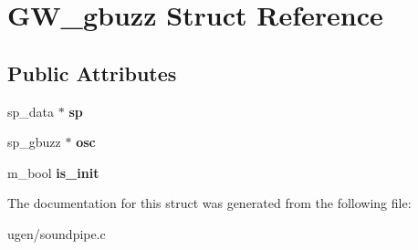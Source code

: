 \hypertarget{structGW__gbuzz}{}\section{G\+W\+\_\+gbuzz Struct Reference}
\label{structGW__gbuzz}
\subsection*{Public Attributes}
\begin{DoxyCompactItemize}
\item 
\hypertarget{structGW__gbuzz_af3f86c160b71675087e0efd784fd743a}{}\label{structGW__gbuzz_af3f86c160b71675087e0efd784fd743a} 
sp\+\_\+data $\ast$ {\bfseries sp}
\item 
\hypertarget{structGW__gbuzz_ab1c0f9555109875b5a79e2bebce9e8a8}{}\label{structGW__gbuzz_ab1c0f9555109875b5a79e2bebce9e8a8} 
sp\+\_\+gbuzz $\ast$ {\bfseries osc}
\item 
\hypertarget{structGW__gbuzz_a166b5549cd7ca18ce34db430a98b3487}{}\label{structGW__gbuzz_a166b5549cd7ca18ce34db430a98b3487} 
m\+\_\+bool {\bfseries is\+\_\+init}
\end{DoxyCompactItemize}


The documentation for this struct was generated from the following file\+:\begin{DoxyCompactItemize}
\item 
ugen/soundpipe.\+c\end{DoxyCompactItemize}
